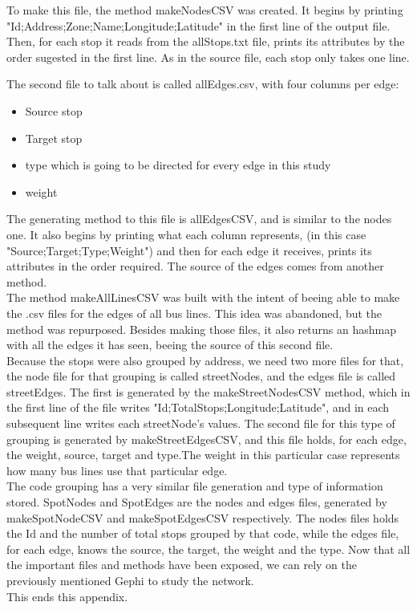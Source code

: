 \documentclass[12pt]{article}
\begin{document}
	To make this file, the method makeNodesCSV was created.
	It begins by printing "Id;Address;Zone;Name;Longitude;Latitude" in the first line of the output file. Then, for each stop it reads from the allStops.txt file, prints its attributes by the order sugested in the first line. As in the source file, each stop only takes one line.
	
	The second file to talk about is called allEdges.csv, with four columns per edge:
	
	\begin{itemize}
		\item Source stop
		\item Target stop
		\item type which is going to be directed for every edge in this study
		\item weight 
	\end{itemize}
	
	The generating method to this file is allEdgesCSV, and is similar to the nodes one.
	It also begins by printing what each column represents, (in this case "Source;Target;Type;Weight") and then for each edge it receives, prints its attributes in the order required. The source of the edges comes from another method.\\
	The method makeAllLinesCSV was built with the intent of beeing able to make the .csv files for the edges of all bus lines. This idea was abandoned, but the method was repurposed. Besides making those files, it also returns an hashmap with all the edges it has seen, beeing the source of this second file.\\
	Because the stops were also grouped by address, we need two more files for that, the node file for that grouping is called streetNodes, and the edges file is called streetEdges. The first is generated by the makeStreetNodesCSV method, which in the first line of the file writes "Id;TotalStops;Longitude;Latitude", and in each subsequent line writes each streetNode's values. The second file for this type of grouping  is generated by makeStreetEdgesCSV, and this file holds, for each edge, the weight, source, target and type.The weight in this particular case represents how many bus lines use that particular edge.\\
	The code grouping has a very similar file generation and type of information stored. SpotNodes and SpotEdges are the nodes and edges files, generated by makeSpotNodeCSV and makeSpotEdgesCSV respectively. The nodes files holds the Id and the number of total stops grouped by that code, while the edges file, for each edge, knows the source, the target, the weight and the type.
	Now that all the important files and methods have been exposed, we can rely on the previously mentioned Gephi to study the network.\\

This ends this appendix.
\end{document}
